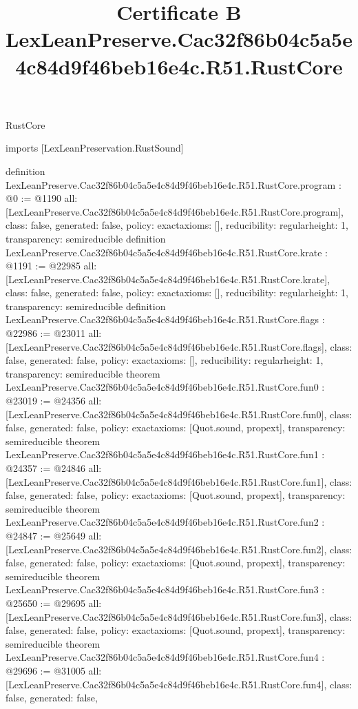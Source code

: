 \begin{lexlean}{RustCore}
\title{Certificate B LexLeanPreserve.Cac32f86b04c5a5e4c84d9f46beb16e4c.R51.RustCore}
\begin{coremodule}
imports [LexLeanPreservation.RustSound]

definition LexLeanPreserve.Cac32f86b04c5a5e4c84d9f46beb16e4c.R51.RustCore.program : @0 := @1190 {
  all: [LexLeanPreserve.Cac32f86b04c5a5e4c84d9f46beb16e4c.R51.RustCore.program],
  class: false,
  generated: false,
  policy: exact{axioms: []},
  reducibility: regular{height: 1},
  transparency: semireducible
}
definition LexLeanPreserve.Cac32f86b04c5a5e4c84d9f46beb16e4c.R51.RustCore.krate : @1191 := @22985 {
  all: [LexLeanPreserve.Cac32f86b04c5a5e4c84d9f46beb16e4c.R51.RustCore.krate],
  class: false,
  generated: false,
  policy: exact{axioms: []},
  reducibility: regular{height: 1},
  transparency: semireducible
}
definition LexLeanPreserve.Cac32f86b04c5a5e4c84d9f46beb16e4c.R51.RustCore.flags : @22986 := @23011 {
  all: [LexLeanPreserve.Cac32f86b04c5a5e4c84d9f46beb16e4c.R51.RustCore.flags],
  class: false,
  generated: false,
  policy: exact{axioms: []},
  reducibility: regular{height: 1},
  transparency: semireducible
}
theorem LexLeanPreserve.Cac32f86b04c5a5e4c84d9f46beb16e4c.R51.RustCore.fun0 : @23019 := @24356 {
  all: [LexLeanPreserve.Cac32f86b04c5a5e4c84d9f46beb16e4c.R51.RustCore.fun0],
  class: false,
  generated: false,
  policy: exact{axioms: [Quot.sound, propext]},
  transparency: semireducible
}
theorem LexLeanPreserve.Cac32f86b04c5a5e4c84d9f46beb16e4c.R51.RustCore.fun1 : @24357 := @24846 {
  all: [LexLeanPreserve.Cac32f86b04c5a5e4c84d9f46beb16e4c.R51.RustCore.fun1],
  class: false,
  generated: false,
  policy: exact{axioms: [Quot.sound, propext]},
  transparency: semireducible
}
theorem LexLeanPreserve.Cac32f86b04c5a5e4c84d9f46beb16e4c.R51.RustCore.fun2 : @24847 := @25649 {
  all: [LexLeanPreserve.Cac32f86b04c5a5e4c84d9f46beb16e4c.R51.RustCore.fun2],
  class: false,
  generated: false,
  policy: exact{axioms: [Quot.sound, propext]},
  transparency: semireducible
}
theorem LexLeanPreserve.Cac32f86b04c5a5e4c84d9f46beb16e4c.R51.RustCore.fun3 : @25650 := @29695 {
  all: [LexLeanPreserve.Cac32f86b04c5a5e4c84d9f46beb16e4c.R51.RustCore.fun3],
  class: false,
  generated: false,
  policy: exact{axioms: [Quot.sound, propext]},
  transparency: semireducible
}
theorem LexLeanPreserve.Cac32f86b04c5a5e4c84d9f46beb16e4c.R51.RustCore.fun4 : @29696 := @31005 {
  all: [LexLeanPreserve.Cac32f86b04c5a5e4c84d9f46beb16e4c.R51.RustCore.fun4],
  class: false,
  generated: false,
}
\end{coremodule}
\end{lexlean}
